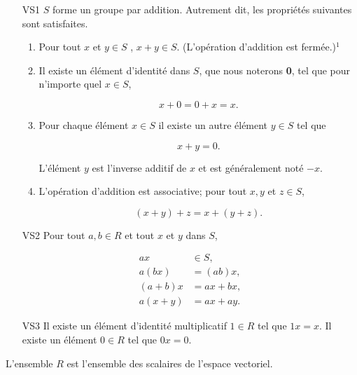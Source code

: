 \documentclass[10pt,twoside,a4paper]{book}
\begin{document}
\begin{enumerate}
  \item[VS1] $S$ forme un groupe par addition. Autrement dit, les propriétés suivantes sont satisfaites.
  
  \begin{enumerate}
    \item Pour tout $x$ et $y \in S$ , $x + y \in S$. (L'opération d'addition est fermée.)$^1$
    \item Il existe un élément d'identité dans $S$, que nous noterons \textbf{0}, tel que pour n'importe quel $x \in S$,
    
    \begin{equation*}
      x + 0 = 0 + x = x.
    \end{equation*}

    \item Pour chaque élément $x \in S$ il existe un autre élément $y \in S$ tel que
    
    \begin{equation*}
      x + y = 0.
    \end{equation*}

    \noindent
    L'élément $y$ est l'inverse additif de $x$ et est généralement noté $-x$.
    \item L'opération d'addition est associative; pour tout $x, y$ et $z \in S$,
    
    \begin{equation*}
      (x + y) + z = x + (y + z).
    \end{equation*}
  \end{enumerate}

  \item[VS2] Pour tout $a, b \in R$ et tout $x$ et $y$ dans $S$,
  
  \begin{align*}
    ax &\in S, \\
    a(bx) &= (ab)x, \\
    (a+b)x &= ax + bx, \\
    a(x+y) &= ax + ay.
  \end{align*}

  \item[VS3] Il existe un élément d'identité multiplicatif $1 \in R$ tel que $1x = x$. Il existe un élément $0 \in R$ tel que $0x = 0$.
  \vspace{4mm}
\end{enumerate}

\noindent
L'ensemble $R$ est l'ensemble des scalaires de l'espace vectoriel.
\vspace{3mm}
\end{document}
